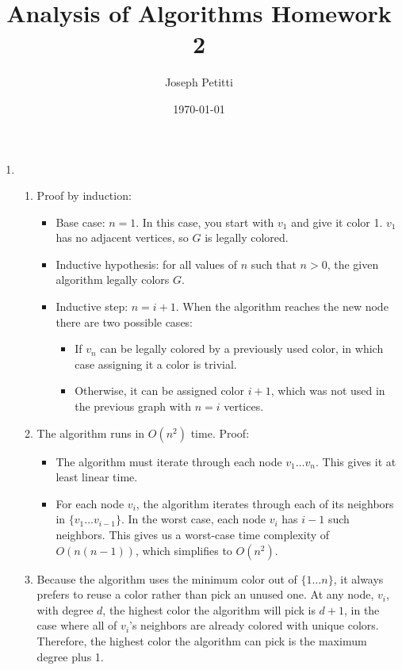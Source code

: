 \documentclass[a4paper, 10pt]{article}
\title{Analysis of Algorithms Homework 2}
\author{Joseph Petitti}
\date{\today}
\begin{document}
\maketitle

\begin{enumerate}
	\item \begin{enumerate}
			\item Proof by induction:
				\begin{itemize}
					\item Base case: $n = 1$. In this case, you start with
						$v_1$ and give it color 1. $v_1$ has no adjacent
						vertices, so $G$ is legally colored.
					\item Inductive hypothesis: for all values of $n$ such that
						$n > 0$, the given algorithm legally colors $G$.
					\item Inductive step: $n = i + 1$. When the algorithm
						reaches the new node there are two possible cases:
						\begin{itemize}
							\item If $v_n$ can be legally colored by a
								previously used color, in which case assigning
								it a color is trivial.
							\item Otherwise, it can be assigned color $i + 1$,
								which was not used in the previous graph with $n
								= i$ vertices.
						\end{itemize}
				\end{itemize}

			\item The algorithm runs in $O(n^2)$ time. Proof:
				\begin{itemize}
					\item The algorithm must iterate through each node $v_1
						\dots v_n$. This gives it at least linear time.
					\item For each node $v_i$, the algorithm iterates through
						each of its neighbors in $\{ v_1 \dots v_{i-1} \}$. In
						the worst case, each node $v_i$ has $i-1$ such
						neighbors. This gives us a worst-case time complexity of
						$O(n (n - 1))$, which simplifies to $O(n^2)$.
				\end{itemize}

			\item Because the algorithm uses the minimum color out of $\{ 1
				\dots n \}$, it always prefers to reuse a color rather than pick
				an unused one. At any node, $v_i$, with degree $d$, the
				highest color the algorithm will pick is $d + 1$, in the case
				where all of $v_i$'s neighbors are already colored with unique
				colors. Therefore, the highest color the algorithm can pick is
				the maximum degree plus 1.


\end{enumerate}
\end{enumerate}
\end{document}
